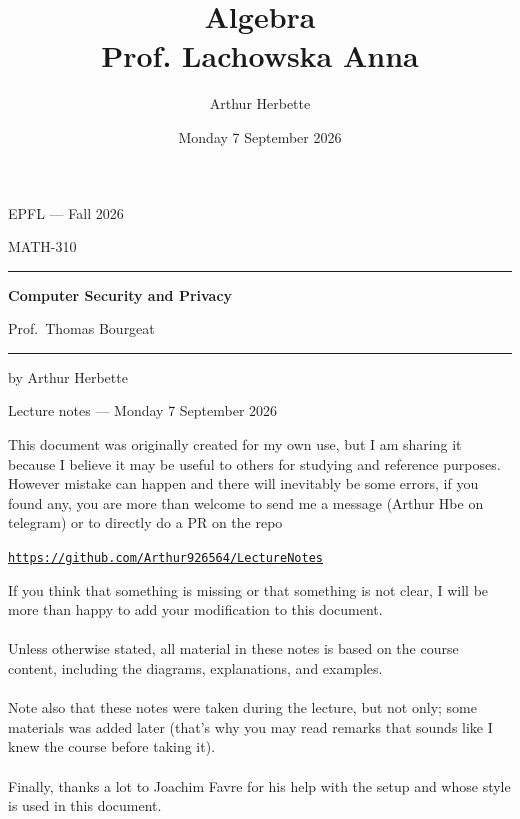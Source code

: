 \documentclass[a4paper]{book}
\title{Algebra \\ Prof. Lachowska Anna}
\author{Arthur Herbette}
\date{Monday 7 September 2026}
\begin{document}
\begin{titlepage}
    \centering
    \vspace*{2cm}
    
    {\large EPFL --- Fall 2026\par}
    \vspace{0.5cm}
    {\small MATH-310\par}
    
    \vspace{2cm}
    \rule{\linewidth}{0.4pt}
    \vspace{0.4cm}
    
    {\huge\bfseries Computer Security and Privacy\par}
    \vspace{0.3cm}
    {\large Prof.\ Thomas Bourgeat\par}
    

    \vspace{0.4cm}
    \rule{\linewidth}{0.4pt}
    
    \vfill
    
    {by Arthur Herbette\par}
    \vspace{0.3cm}
    {\small Lecture notes --- Monday 7 September 2026\par}
    
    \vspace{2cm}
\end{titlepage}
This document was originally created for my own use, but I am sharing it because I believe it may be useful to others for studying and reference purposes. However mistake can happen and there will inevitably be some errors, if you found any, you are more than welcome to send me a message (Arthur Hbe on telegram) or to directly do a PR on the repo 
\begin{center}
	\texttt{\href{https://github.com/Arthur926564/LectureNotes}{https://github.com/Arthur926564/LectureNotes}}
\end{center}

If you think that something is missing or that something is not clear, I will be more than happy to add your modification to this document.\\
$ $\\
Unless otherwise stated, all material in these notes is based on the course content, including the diagrams, explanations, and examples.\\
$ $\\
Note also that these notes were taken during the lecture, but not only; some materials was added later (that's why you may read remarks that sounds like I knew the course before taking it).\\
$ $\\
Finally, thanks a lot to Joachim Favre for his help with the setup and whose style is used in this document.
\end{document}
